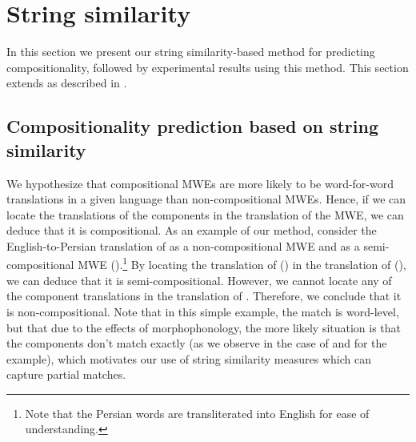 \documentclass[output=paper
,modfonts
,nonflat]{langsci/langscibook}
\begin{document}
\section{String similarity\label{sec:stringsim}}

In this section we present our string similarity-based method for
predicting compositionality, followed by experimental results using
this method. This section extends \cite{salehi2013} as described in
.


\subsection{Compositionality prediction based on string similarity\label{sec:stringsimmethod}}

We hypothesize that compositional MWEs are more likely to be
word-for-word translations in a given language than non-compositional
MWEs. Hence, if we can locate the translations of the components in
the translation of the MWE, we can deduce that it is compositional.
As an example of our method, consider the English-to-Persian
translation of  as a non-compositional MWE
and  as a semi-compositional MWE
().\footnote{Note that the Persian
  words are transliterated into English for ease of understanding.} By
locating the translation of  () in
the translation of  (), we can deduce that it is semi-compositional. However, we
cannot locate any of the component translations in the translation of
. Therefore, we conclude that it is
non-compositional. Note that in this simple example, the match is
word-level, but that due to the effects of morphophonology, the more
likely situation is that the components don't match exactly (as we
observe in the case of  and  for
the  example), which motivates our use of
string similarity measures which can capture partial matches.
\end{document}
